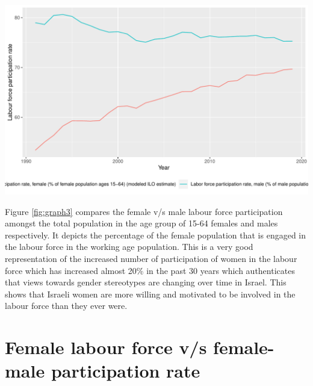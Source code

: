 \documentclass[11pt,a4paper,]{article}
\let\origfigure\figure
\let\endorigfigure\endfigure
\renewenvironment{figure}[1][2] {
    \expandafter\origfigure\expandafter[H]
} {
    \endorigfigure
}%
\begin{document}
\begin{figure}
\centering
\includegraphics{report_files/figure-latex/graph3-1.pdf}
\caption{\label{fig:graph3}Female v/s Male labour force participation}
\end{figure}

Figure \ref{fig:graph3} compares the female v/s male labour force participation amongst the total population in the age group of 15-64 females and males respectively. It depicts the percentage of the female population that is engaged in the labour force in the working age population. This is a very good representation of the increased number of participation of women in the labour force which has increased almost 20\% in the past 30 years which authenticates that views towards gender stereotypes are changing over time in Israel. This shows that Israeli women are more willing and motivated to be involved in the labour force than they ever were.

\hypertarget{female-labour-force-vs-female-male-participation-rate}{%
\section{Female labour force v/s female-male participation rate}\label{female-labour-force-vs-female-male-participation-rate}}
\end{document}
